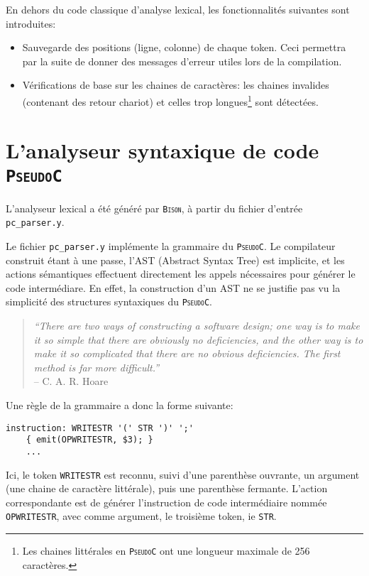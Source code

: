 \documentclass[12pt,a4paper,openright]{report}
\newcommand{\nom}[1]{\textsc{\texttt{#1}}}
\newcommand{\pc}{\nom{PseudoC}}
\newcommand{\bison}{\nom{Bison}}
\begin{document}
    En dehors du code classique d'analyse lexical, les fonctionnalités
    suivantes sont introduites:

    \begin{itemize}
        \item Sauvegarde des positions (ligne, colonne) de chaque
        token. Ceci permettra par la suite de donner des messages
        d'erreur utiles lors de la compilation.
        \item Vérifications de base sur les chaines de caractères: les
        chaines invalides (contenant des retour chariot) et celles trop
        longues\footnote{Les chaines littérales en \pc{} ont une longueur
        maximale de 256 caractères.} sont détectées.
    \end{itemize}

\chapter{L'analyseur syntaxique de code \pc}
    L'analyseur lexical a été généré par \bison, à partir du fichier
    d'entrée \texttt{pc\_parser.y}.

    Le fichier \texttt{pc\_parser.y} implémente la grammaire du \pc. Le
    compilateur construit étant à une passe, l'AST (Abstract Syntax
    Tree) est implicite, et les actions sémantiques effectuent
    directement les appels nécessaires pour générer le code
    intermédiare. En effet, la construction d'un AST ne se justifie pas
    vu la simplicité des structures syntaxiques du \pc.

\begin{quote}
\emph{``There are two ways of constructing a software design; one way is to make
it so simple that there are obviously no deficiencies, and the other way
is to make it so complicated that there are no obvious deficiencies. The
first method is far more difficult.''} \\
-- C. A. R. Hoare
\end{quote}

    Une règle de la grammaire a donc la forme suivante:
\begin{verbatim}
instruction: WRITESTR '(' STR ')' ';'
    { emit(OPWRITESTR, $3); }
    ...
\end{verbatim}

    Ici, le token \texttt{WRITESTR} est reconnu, suivi d'une parenthèse
    ouvrante, un argument (une chaine de caractère littérale), puis une
    parenthèse fermante. L'action correspondante est de générer l'instruction de
    code intermédiaire nommée \texttt{OPWRITESTR}, avec comme argument, le
    troisième token, ie \texttt{STR}.
    
\end{document}
